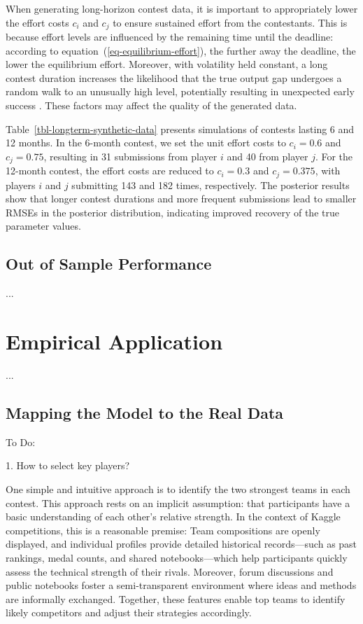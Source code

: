 \documentclass[mnsc]{informs3}
\begin{document}
When generating long-horizon contest data, it is important to appropriately lower the effort costs $c_i$ and $c_j$ to ensure sustained effort from the contestants.
This is because effort levels are influenced by the remaining time until the deadline:
according to equation~(\ref{eq-equilibrium-effort}), the further away the deadline, the lower the equilibrium effort. 
Moreover, with volatility held constant, a long contest duration increases the likelihood that the true output gap undergoes a random walk to an unusually high level, potentially resulting in unexpected early success \citep{ryvkin2022fight}.
These factors may affect the quality of the generated data. 

Table~\ref{tbl-longterm-synthetic-data} presents simulations of contests lasting 6 and 12 months. 
In the 6-month contest, we set the unit effort costs to $c_i = 0.6$ and $c_j = 0.75$, resulting in 31 submissions from player $i$ and 40 from player $j$.
For the 12-month contest, the effort costs are reduced to $c_i = 0.3$ and $c_j = 0.375$, with players $i$ and $j$ submitting 143 and 182 times, respectively.
The posterior results show that longer contest durations and more frequent submissions lead to smaller RMSEs in the posterior distribution, indicating improved recovery of the true parameter values.


\subsection{Out of Sample Performance}

...


\section{Empirical Application}\label{sec-kaggle-application}

...

\subsection{Mapping the Model to the Real Data}

To Do:

1. How to select key players? 

One simple and intuitive approach is to identify the two strongest teams in each contest.
This approach rests on an implicit assumption: that participants have a basic understanding of each other’s relative strength. 
In the context of Kaggle competitions, this is a reasonable premise: 
Team compositions are openly displayed, and individual profiles provide detailed historical records—such as past rankings, medal counts, and shared notebooks—which help participants quickly assess the technical strength of their rivals. 
Moreover, forum discussions and public notebooks foster a semi-transparent environment where ideas and methods are informally exchanged. 
Together, these features enable top teams to identify likely competitors and adjust their strategies accordingly.
\end{document}
